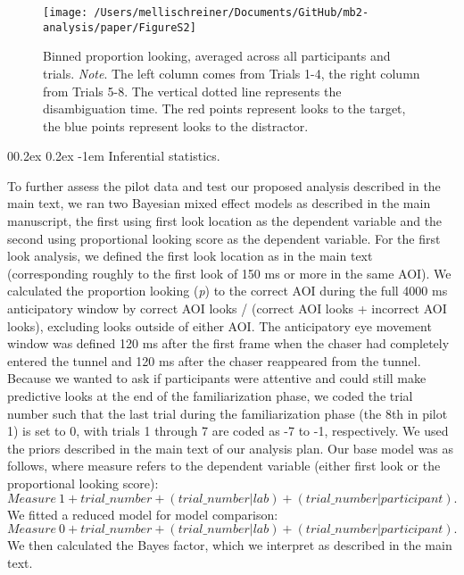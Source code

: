 \documentclass[
  man, donotrepeattitle,floatsintext]{apa6}
\makeatletter
\let\oldparagraph\paragraph
\renewcommand{\paragraph}{
    \@ifstar
      \xxxParagraphStar
      \xxxParagraphNoStar
  }
\newcommand{\xxxParagraphStar}[1]{\oldparagraph*{#1}\mbox{}}
\newcommand{\xxxParagraphNoStar}[1]{\oldparagraph{#1}\mbox{}}
\renewcommand{\paragraph}{\@startsection{paragraph}{4}{\parindent}%
  {0\baselineskip \@plus 0.2ex \@minus 0.2ex}%
  {-1em}%
  {\normalfont\normalsize\bfseries\itshape\typesectitle}}
\makeatother
\begin{document}
\begin{figure}

\texttt{[image: /Users/mellischreiner/Documents/GitHub/mb2-analysis/paper/FigureS2]} \hfill{}

\caption{Binned proportion looking, averaged across all participants and trials. \newline{} \textit{Note}. The left column comes from Trials 1-4, the right column from Trials 5-8. The vertical dotted line represents the disambiguation time. The red points represent looks to the target, the blue points represent looks to the distractor.}\label{fig:figS2}
\end{figure}

\paragraph{Inferential statistics.}\label{inferential-statistics.}

To further assess the pilot data and test our proposed analysis described in the main text, we ran two Bayesian mixed effect models as described in the main manuscript, the first using first look location as the dependent variable and the second using proportional looking score as the dependent variable. For the first look analysis, we defined the first look location as in the main text (corresponding roughly to the first look of 150 ms or more in the same AOI). We calculated the proportion looking (\emph{p}) to the correct AOI during the full 4000 ms anticipatory window by correct AOI looks / (correct AOI looks + incorrect AOI looks), excluding looks outside of either AOI. The anticipatory eye movement window was defined 120 ms after the first frame when the chaser had completely entered the tunnel and 120 ms after the chaser reappeared from the tunnel.\\
Because we wanted to ask if participants were attentive and could still make predictive looks at the end of the familiarization phase, we coded the trial number such that the last trial during the familiarization phase (the 8th in pilot 1) is set to 0, with trials 1 through 7 are coded as -7 to -1, respectively. We used the priors described in the main text of our analysis plan. Our base model was as follows, where measure refers to the dependent variable (either first look or the proportional looking score):\\
\(Measure ~ 1 + trial\_number + (trial\_number | lab) + (trial\_number | participant).\)
We fitted a reduced model for model comparison:
\(Measure  ~ 0 + trial\_number + ( trial\_number | lab) + (trial\_number | participant).\)
We then calculated the Bayes factor, which we interpret as described in the main text.
\end{document}
